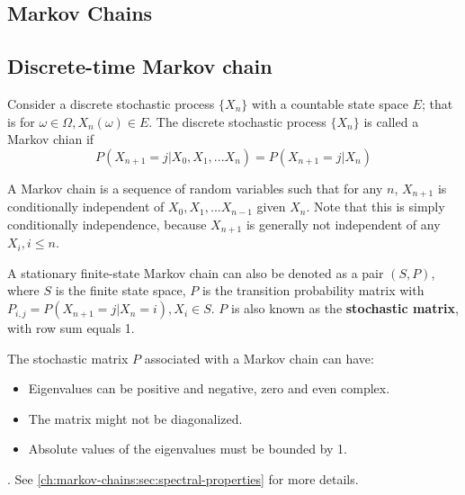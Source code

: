 
\begin{refsection}
\startcontents[chapters]
\chapter{Markov Chains}\label{ch:markov-chains}
	
\section{Discrete-time Markov chain }
\begin{definition}
Consider a discrete stochastic process $\{X_n\}$ with a countable state space $E$; that is for $\omega \in \Omega, X_n(\omega) \in E$.
The discrete stochastic process $\{X_n\}$ is called a Markov chian if
$$P(X_{n+1}=j|X_0,X_1,...X_n) = P(X_{n+1}=j|X_n)$$
\end{definition}
\begin{remark}
A Markov chain is a sequence of random variables such that for any $n$, $X_{n+1}$ is conditionally independent of $X_0,X_1,...X_{n-1}$ given $X_n$. Note that this is simply conditionally independence, because $X_{n+1}$ is generally not independent of any $X_{i},i\leq n$.
\end{remark}


\begin{definition}
A stationary finite-state Markov chain can also be denoted as a pair $(S,P)$, where $S$ is the finite state space, $P$ is the transition probability matrix with $P_{i,j} = P(X_{n+1}=j|X_n=i), X_i\in S$. $P$ is also known as the \textbf{stochastic matrix}, with row sum equals 1.
\end{definition}


\begin{remark}
The stochastic matrix $P$ associated with a Markov chain can have: 
	\begin{itemize}
	\item Eigenvalues  can be positive and negative, zero and even complex.
	\item The matrix might not be diagonalized.
	\item 	Absolute values of the eigenvalues must be bounded by 1. 
\end{itemize}. See \autoref{ch:markov-chains:sec:spectral-properties} for more details.
\end{remark}




\end{refsection}
